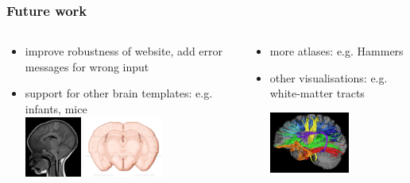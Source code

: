 \documentclass[10pt,xcolor=table,aspectratio=169]{beamer}
\begin{document}
\begin{frame}
 \frametitle{Future work}

 \vspace{-2em}
 
 \begin{columns}
  \begin{column}[t]{0.5\textwidth}
  \begin{itemize}
  \item improve robustness of website, add error messages for wrong input
  
  \vspace{2em}
  
  \item support for other brain templates: e.g. infants, mice\\
  \vspace{1em}
  \includegraphics[height=2cm]{images/infantBrain} \includegraphics[height=2cm]{images/mouse}
    
   \end{itemize}
  \end{column}
  \begin{column}[t]{0.5\textwidth}

  \begin{itemize}
  \item more atlases: e.g. Hammers
  
  \vspace{3em}
  
  \item other visualisations: e.g. white-matter tracts\\
  \vspace{2em}
  
  \includegraphics[height=2cm]{images/wmTracts}

  \end{itemize}

  
  \end{column}

 \end{columns}

 
 
 
  
\end{frame}
\end{document}
